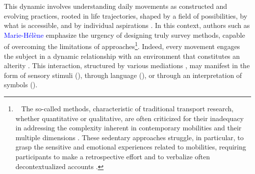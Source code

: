 \begin{refsegment}
This dynamic involves understanding daily movements as constructed and evolving practices, rooted in life trajectories, shaped by a field of possibilities, by what is accessible, and by individual aspirations \textcolor{blue}{\autocite[40]{kaufmann_retour_2014}}. In this context, authors such as \textcolor{blue}{Marie-Hélène} \textcolor{blue}{\textcite{massot_mobilites_2010}} emphasize the urgency of designing truly  survey methods, capable of overcoming the limitations of  approaches\footnote{~
    The so-called  methods, characteristic of traditional transport research, whether quantitative or qualitative, are often criticized for their inadequacy in addressing the complexity inherent in contemporary mobilities and their multiple dimensions \textcolor{blue}{\autocites[110-111]{buscher_mobile_2009}[178]{merriman_rethinking_2014}}. These sedentary approaches struggle, in particular, to grasp the sensitive and emotional experiences related to mobilities, requiring participants to make a retrospective effort and to verbalize often decontextualized accounts \textcolor{blue}{\autocite[107]{buscher_mobile_2009}}.
}. Indeed, every movement engages the subject in a dynamic relationship with an environment that constitutes an alterity \textcolor{blue}{\autocite[4]{despres_replacer_2019}}. This interaction, structured by various mediations \textcolor{blue}{\autocite[]{freitag_dialectique_nodate}}, may manifest in the form of sensory stimuli (), through language (), or through an interpretation of symbols ().%


\end{refsegment}
